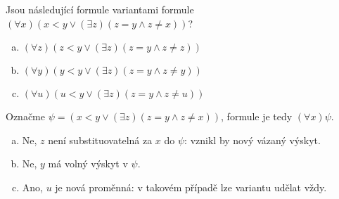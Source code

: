 \begin{problem}
    
    Jsou následující formule variantami formule $(\forall x)(x<y \vee (\exists z)(z=y \wedge z\ne x))$?
    \begin{enumerate}[(a)]
        \item $(\forall z)(z<y \vee (\exists z)(z=y \wedge z\ne z))$
        \item $(\forall y)(y<y \vee (\exists z)(z=y \wedge z\ne y))$
        \item $(\forall u)(u<y \vee (\exists z)(z=y \wedge z\ne u))$
    \end{enumerate}

    \begin{solution}
        Označme $\psi=(x<y \vee (\exists z)(z=y \wedge z\ne x))$, formule je tedy $(\forall x)\psi$.

        \begin{enumerate}[(a)]
            \item Ne, $z$ není substituovatelná za $x$ do $\psi$: vznikl by nový vázaný výskyt.
            \item Ne, $y$ má volný výskyt v $\psi$.
            \item Ano, $u$ je nová proměnná: v takovém případě lze variantu udělat vždy.
        \end{enumerate}        
        
    \end{solution}

\end{problem}


